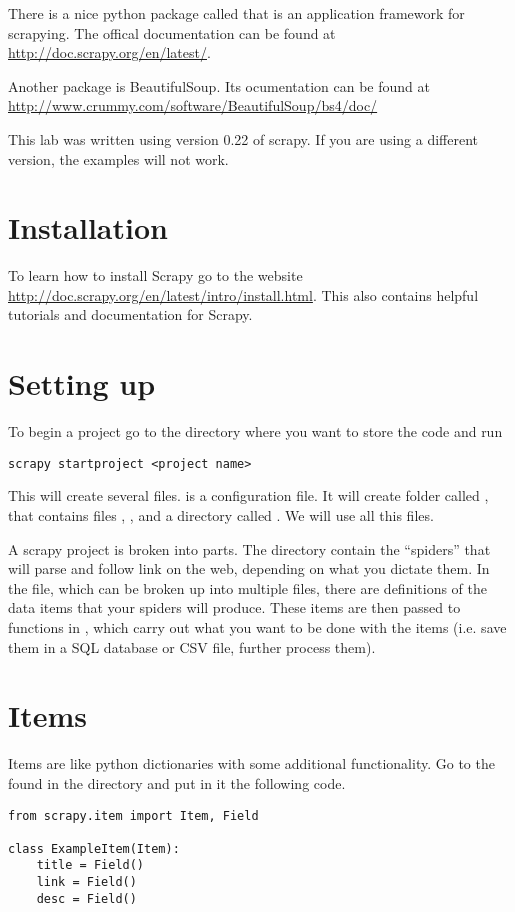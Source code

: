 There is a nice python package called  that is an application framework for scrapying.
The offical documentation can be found at \url{http://doc.scrapy.org/en/latest/}. 

Another package is BeautifulSoup. Its ocumentation can be found at \url{http://www.crummy.com/software/BeautifulSoup/bs4/doc/}

\begin{warn}
This lab was written using version 0.22 of scrapy. 
If you are using a different version, the examples will not work.
\end{warn}

\section*{Installation}

To learn how to install Scrapy go to the website \url{http://doc.scrapy.org/en/latest/intro/install.html}. 
This also contains helpful tutorials and documentation for Scrapy.

\section*{Setting up}
To begin a project go to the directory where you want to store the code and run
\begin{lstlisting}
scrapy startproject <project name>
\end{lstlisting}
This will create several files.  is a configuration file. 
It will create folder called  , that contains files , ,  and a directory called . 
We will use all this files.

A scrapy project is broken into parts. 
The  directory contain the ``spiders'' that will parse and follow link on the web, depending on what you dictate them.
In the  file, which can be broken up into multiple files, there are definitions of the data items that your spiders will produce. 
These items are then passed to functions in , which carry out what you want to be done with the items (i.e. save them in a SQL database or CSV file, further process them).

\section*{Items}
Items are like python dictionaries with some additional functionality. 
Go to the  found in the  directory and put in it the following code.
\begin{lstlisting}
from scrapy.item import Item, Field

class ExampleItem(Item):
    title = Field()
    link = Field()
    desc = Field()
\end{lstlisting}

